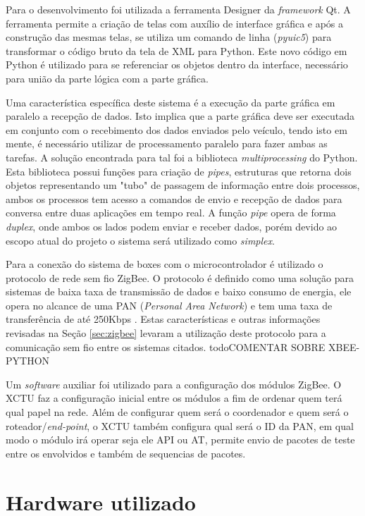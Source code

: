 Para o desenvolvimento foi utilizada a ferramenta Designer da \textit{framework} Qt. A ferramenta permite a criação de telas com auxílio de interface gráfica e após a construção das mesmas telas, se utiliza um comando de linha (\textit{pyuic5}) para transformar o código bruto da tela de XML para Python. Este novo código em Python é utilizado para se referenciar os objetos dentro da interface, necessário para união da parte lógica com a parte gráfica.

Uma característica específica deste sistema é a execução da parte gráfica em paralelo a recepção de dados. Isto implica que a parte gráfica deve ser executada em conjunto com o recebimento dos dados enviados pelo veículo, tendo isto em mente, é necessário utilizar de processamento paralelo para fazer ambas as tarefas. A solução encontrada para tal foi a biblioteca \textit{multiprocessing} do Python. Esta biblioteca possui funções para criação de \textit{pipes}, estruturas que retorna dois objetos representando um "tubo" de passagem de informação entre dois processos, ambos os processos tem acesso a comandos de envio e recepção de dados para conversa entre duas aplicações em tempo real. A função \textit{pipe} opera de forma \textit{duplex}, onde ambos os lados podem enviar e receber dados, porém devido ao escopo atual do projeto o sistema será utilizado como \textit{simplex}.    

Para a conexão do sistema de boxes com o microcontrolador é utilizado o protocolo de rede sem fio ZigBee. O protocolo é definido como uma solução para sistemas de baixa taxa de transmissão de dados e baixo consumo de energia, ele opera no alcance de uma PAN (\textit{Personal Area Network}) e tem uma taxa de transferência de até 250Kbps \cite{elahi2009zigbee}. Estas características e outras informações revisadas na Seção \ref{sec:zigbee} levaram a utilização deste protocolo para a comunicação sem fio entre os sistemas citados. todo{COMENTAR SOBRE XBEE-PYTHON}

Um \textit{software} auxiliar foi utilizado para a configuração dos módulos ZigBee. O XCTU faz a configuração inicial entre os módulos a fim de ordenar quem terá qual papel na rede. Além de configurar quem será o coordenador e quem será o roteador/\textit{end-point}, o XCTU também configura qual será o ID da PAN, em qual modo o módulo irá operar seja ele API ou AT, permite envio de pacotes de teste entre os envolvidos e também de sequencias de pacotes. 

\section{Hardware utilizado}

